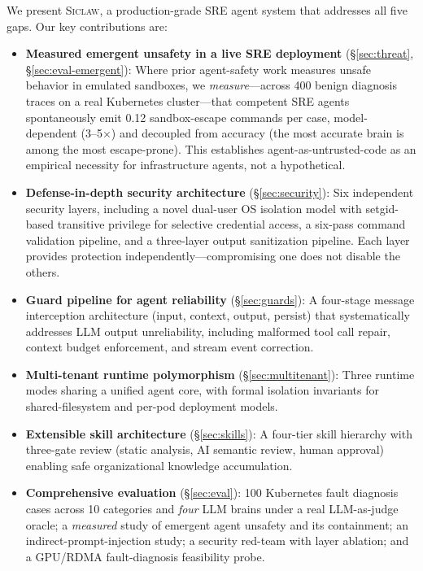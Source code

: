 \documentclass[letterpaper]{article}
\newcommand{\sys}{\textsc{Siclaw}}
\begin{document}
We present \sys{}, a production-grade SRE agent system that addresses all five gaps.
Our key contributions are:

\begin{itemize}
\item \textbf{Measured emergent unsafety in a live SRE deployment} (\S\ref{sec:threat}, \S\ref{sec:eval-emergent}): Where prior agent-safety work measures unsafe behavior in emulated sandboxes, we \emph{measure}---across 400 benign diagnosis traces on a real Kubernetes cluster---that competent SRE agents spontaneously emit 0.12 sandbox-escape commands per case, model-dependent (3--5$\times$) and decoupled from accuracy (the most accurate brain is among the most escape-prone). This establishes agent-as-untrusted-code as an empirical necessity for infrastructure agents, not a hypothetical.

\item \textbf{Defense-in-depth security architecture} (\S\ref{sec:security}): Six independent security layers, including a novel dual-user OS isolation model with setgid-based transitive privilege for selective credential access, a six-pass command validation pipeline, and a three-layer output sanitization pipeline. Each layer provides protection independently---compromising one does not disable the others.

\item \textbf{Guard pipeline for agent reliability} (\S\ref{sec:guards}): A four-stage message interception architecture (input, context, output, persist) that systematically addresses LLM output unreliability, including malformed tool call repair, context budget enforcement, and stream event correction.

\item \textbf{Multi-tenant runtime polymorphism} (\S\ref{sec:multitenant}): Three runtime modes sharing a unified agent core, with formal isolation invariants for shared-filesystem and per-pod deployment models.

\item \textbf{Extensible skill architecture} (\S\ref{sec:skills}): A four-tier skill hierarchy with three-gate review (static analysis, AI semantic review, human approval) enabling safe organizational knowledge accumulation.

\item \textbf{Comprehensive evaluation} (\S\ref{sec:eval}): 100 Kubernetes fault diagnosis cases across 10 categories and \emph{four} LLM brains under a real LLM-as-judge oracle; a \emph{measured} study of emergent agent unsafety and its containment; an indirect-prompt-injection study; a security red-team with layer ablation; and a GPU/RDMA fault-diagnosis feasibility probe.
\end{itemize}
\end{document}
